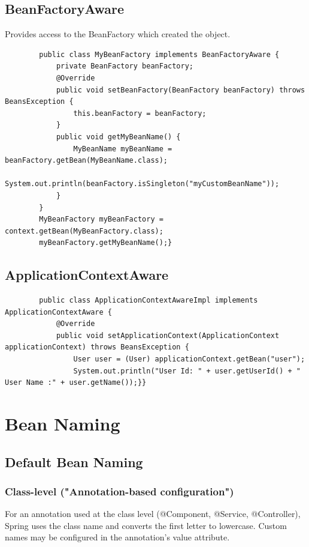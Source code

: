 \documentclass{scrartcl}
\begin{document}
\subsection{BeanFactoryAware}

    Provides access to the BeanFactory which created the object.

    \begin{lstlisting}
        public class MyBeanFactory implements BeanFactoryAware {
            private BeanFactory beanFactory;
            @Override
            public void setBeanFactory(BeanFactory beanFactory) throws BeansException {
                this.beanFactory = beanFactory;
            }
            public void getMyBeanName() {
                MyBeanName myBeanName = beanFactory.getBean(MyBeanName.class);
                System.out.println(beanFactory.isSingleton("myCustomBeanName"));
            }
        }
        MyBeanFactory myBeanFactory = context.getBean(MyBeanFactory.class);
        myBeanFactory.getMyBeanName();}
    \end{lstlisting}

\subsection{ApplicationContextAware}
    \begin{lstlisting}
        public class ApplicationContextAwareImpl implements ApplicationContextAware {
            @Override
            public void setApplicationContext(ApplicationContext applicationContext) throws BeansException {
                User user = (User) applicationContext.getBean("user");
                System.out.println("User Id: " + user.getUserId() + " User Name :" + user.getName());}}
    \end{lstlisting}


\section{Bean Naming}
\label{sec:bean-naming}
\subsection{Default Bean Naming}
\subsubsection{Class-level ("Annotation-based configuration")}
For an annotation used at the class level (@Component, @Service, @Controller), Spring uses the class name and converts the first letter to lowercase.
Custom names may be configured in the annotation's value attribute.
\end{document}
